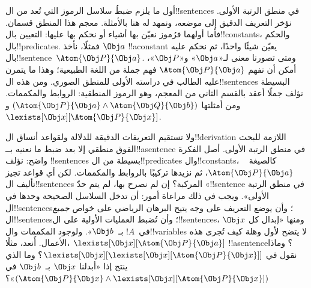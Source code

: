 \documentclass[../../../include/open-logic-section]{subfiles}
\begin{document}


أول ما يلزم ضبطُ سلاسل الرموز التي تُعد من ال!!{sentence}s في
منطق الرتبة الأولى. نؤخر التعريف الدقيق إلى موضعه، ونمهد له هنا
بالأمثلة. معجم هذا المنطق قسمان. فأما أولهما فرُموز نعيّن بها أشياء
أو نحكم بها عليها: التعيين بال!!{constant}s، والحكم بال!!{predicate}s.
فمثلًا، نأخذ $\Obj a$ !!a{constant} يعيّن شيئًا واحدًا، ثم نحكم
عليه بال!!{sentence}~$\Atom{\Obj P}{\Obj a}$. ومتى تصورنا معنى
لـ«$\Obj a$» و«$\Obj P$»، أمكن أن نفهم
$\Atom{\Obj P}{\Obj a}$ فهم جملة من اللغة الطبيعية؛ وهذا ما
يتمرن عليه الطالب في دراسته الأولى للمنطق الصوري. ومن هذه
ال!!{sentence}s البسيطة نؤلف جملًا أعقد بالقسم الثاني من المعجم،
وهو الرموز المنطقية: الروابط والمكممات. ومن أمثلتها
$(\Atom{\Obj P}{\Obj a} \land \Atom{\Obj Q}{\Obj b})$
و~$\lexists[\Obj x][\Atom{\Obj P}{\Obj x}]$.

ولا تستقيم التعريفات الدقيقة للدلالة ولقواعد أنساق ال!!{derivation}
اللازمة للبحث الفوق منطقي إلا بعد ضبط ما نعنيه بــ!!a{sentence}
في منطق الرتبة الأولى. أصل الفكرة واضح: نؤلف
!!{sentence}s بسيطة من ال!!{predicate}s وال!!{constant}s، كالصيغة
~$\Atom{\Obj P}{\Obj a}$، ثم نزيدها تركيبًا بالروابط والمكممات.
لكن أي قواعد تجيز تأليف ال!!{sentence}s المركبة؟ إن لم نصرح
بها، لم يتم حدّ «!!{sentence} في منطق الرتبة الأولى».
ويجب في ذلك مراعاة أمور: أن تدخل السلاسل الصحيحة وحدها في
ال!!{sentence}s؛ وأن يوضع التعريف على وجه يتيح البرهان الرياضي
على خواص \emph{جميع} ال!!{sentence}s؛ وأن تُضبط العمليات الأولية
على ال!!{sentence}s، ومنها «إبدال كل $\Obj x$ في~$!A$
بـ~$\Obj b$». ولوجود المكممات وال!!{variable}s لا يتضح لأول وهلة
كيف تُجرى هذه الأعمال. أَنعد، مثلًا،
$\lexists[\Obj x][\Atom{\Obj P}{\Obj a}]$ !!a{sentence}؟
وماذا نقول في
$\lexists[\Obj x][\lexists[\Obj x][\Atom{\Obj P}{\Obj x}]]$؟
وما الذي ينتج إذا «أبدلنا $\Obj x$ بـ~$\Obj b$ في
$(\Atom{\Obj P}{\Obj x} \land
\lexists[\Obj x][\Atom{\Obj P}{\Obj x}])$»؟
\end{document}

